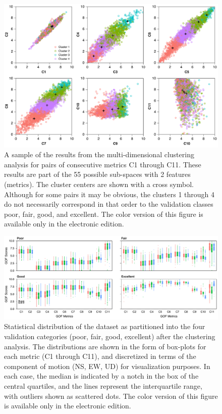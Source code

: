 \begin{figure}
	\centering
	\includegraphics[width=\textwidth]{figures/pdf/figure-05}
	\caption{A sample of the results from the multi-dimensional clustering analysis for pairs of consecutive metrics C1 through C11. These results are part of the 55 possible sub-spaces with 2 features (metrics). The cluster centers are shown with a cross symbol. Although for some pairs it may be obvious, the clusters 1 through 4 do not necessarily correspond in that order to the validation classes poor, fair, good, and excellent. The color version of this figure is available only in the electronic edition.}
	\label{fig:clusters}
\end{figure}

\begin{figure}
	\centering
	\includegraphics[width=\textwidth]{figures/pdf/figure-06}
	\caption{Statistical distribution of the dataset as partitioned into the four validation categories (poor, fair, good, excellent) after the clustering analysis. The distributions are shown in the form of box-plots for each metric (C1 through C11), and discretized in terms of the component of motion (NS, EW, UD) for visualization purposes. In each case, the median is indicated by a notch in the box of the central quartiles, and the lines represent the interquartile range, with outliers shown as scattered dots. The color version of this figure is available only in the electronic edition.}
	\label{fig:boxed-clusters}
\end{figure}

